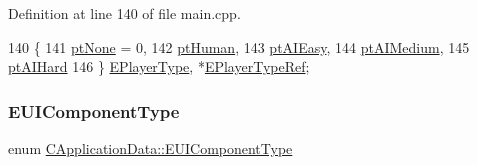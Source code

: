 Definition at line 140 of file main.\+cpp.


\begin{DoxyCode}
140                     \{
141             \hyperlink{classCApplicationData_ae04b6b340297311972ce1e955196fcaaa091de1adaa447ed15f9f6bb25f0880f7}{ptNone} = 0,
142             \hyperlink{classCApplicationData_ae04b6b340297311972ce1e955196fcaaaf06f9bc64db8860bc03ecc330b11f234}{ptHuman},
143             \hyperlink{classCApplicationData_ae04b6b340297311972ce1e955196fcaaa94da5a073589347212dc8f08c02a17a5}{ptAIEasy},
144             \hyperlink{classCApplicationData_ae04b6b340297311972ce1e955196fcaaa212e16bbc4488c26c54f3b37ac3a336e}{ptAIMedium},
145             \hyperlink{classCApplicationData_ae04b6b340297311972ce1e955196fcaaa421a2ddbb6243ca4d7e886bcbf490af5}{ptAIHard}
146         \} \hyperlink{classCApplicationData_ae04b6b340297311972ce1e955196fcaa}{EPlayerType}, *\hyperlink{classCApplicationData_a26f033ac5752403a511af304618f90fd}{EPlayerTypeRef};
\end{DoxyCode}
\hypertarget{classCApplicationData_ad49585591fc53bff1c89bc512170280d}{}\label{classCApplicationData_ad49585591fc53bff1c89bc512170280d} 
\subsubsection{\texorpdfstring{E\+U\+I\+Component\+Type}{EUIComponentType}}
{\footnotesize\ttfamily enum \hyperlink{classCApplicationData_ad49585591fc53bff1c89bc512170280d}{C\+Application\+Data\+::\+E\+U\+I\+Component\+Type}\hspace{0.3cm}{\ttfamily [protected]}}

